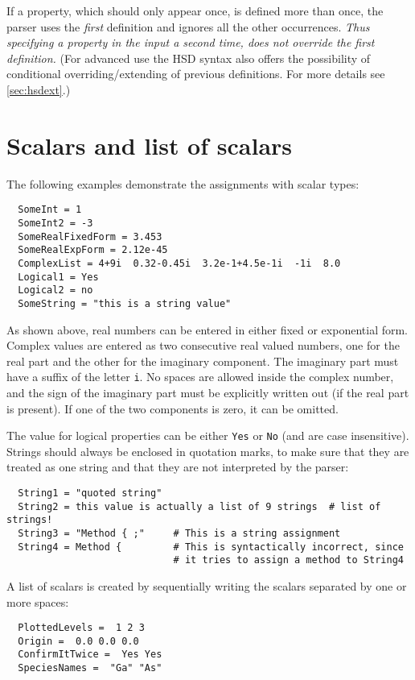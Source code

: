 If a property, which should only appear once, is defined more than once, the
parser uses the \emph{first} definition and ignores all the other occurrences.
\emph{Thus specifying a property in the input a second time, does not override
  the first definition.} (For advanced use the HSD syntax also offers the
possibility of conditional overriding/extending of previous definitions. For
more details see \ref{sec:hsdext}.)


\section{Scalars and list of scalars}

The following examples demonstrate the assignments with scalar types:
\begin{verbatim}
  SomeInt = 1
  SomeInt2 = -3
  SomeRealFixedForm = 3.453
  SomeRealExpForm = 2.12e-45
  ComplexList = 4+9i  0.32-0.45i  3.2e-1+4.5e-1i  -1i  8.0
  Logical1 = Yes
  Logical2 = no
  SomeString = "this is a string value"
\end{verbatim}

As shown above, real numbers can be entered in either fixed or exponential
form. Complex values are entered as two consecutive real valued numbers, one for
the real part and the other for the imaginary component. The imaginary part must
have a suffix of the letter \verb|i|.  No spaces are allowed inside the complex
number, and the sign of the imaginary part must be explicitly written out (if
the real part is present).  If one of the two components is zero, it can be
omitted.

The value for logical properties can be either \verb|Yes| or \verb|No| (and are
case insensitive). Strings should always be enclosed in quotation marks, to make
sure that they are treated as one string and that they are not interpreted by
the parser:
\begin{verbatim}
  String1 = "quoted string"
  String2 = this value is actually a list of 9 strings  # list of strings!
  String3 = "Method { ;"     # This is a string assignment
  String4 = Method {         # This is syntactically incorrect, since
                             # it tries to assign a method to String4
\end{verbatim}

A list of scalars is created by sequentially writing the scalars
separated by one or more spaces:
\begin{verbatim}
  PlottedLevels =  1 2 3
  Origin =  0.0 0.0 0.0
  ConfirmItTwice =  Yes Yes
  SpeciesNames =  "Ga" "As"
\end{verbatim}

